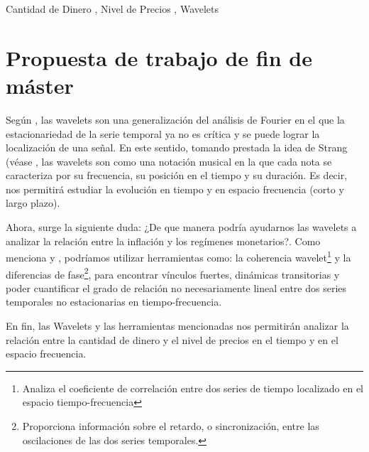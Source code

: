 \documentclass[a4paper,fleqn]{cas-sc}
\begin{document}
\begin{keywords}
    Cantidad de Dinero \sep
    Nivel de Precios \sep
    Wavelets
\end{keywords}

\maketitle


\section{Propuesta de trabajo de fin de máster}

Según \cite{Ramsey2016}, las wavelets son una generalización del análisis de Fourier en el que la estacionariedad de la serie temporal ya no es crítica y se puede lograr la localización de una señal. En este sentido, tomando prestada la idea de Strang (véase \cite{Strang1996}, las wavelets son como una notación musical en la que cada nota se caracteriza por su frecuencia, su posición en el tiempo y su duración. Es decir, nos permitirá estudiar la evolución en tiempo y en espacio frecuencia (corto y largo plazo). 

Ahora, surge la siguiente duda: ¿De que manera podría ayudarnos las wavelets a analizar la relación entre la inflación y los regímenes monetarios?. Como menciona \cite{AguiarConraria2008} y \cite{Jiang2015}, podríamos utilizar herramientas como: la coherencia wavelet\footnote[1]{Analiza el coeficiente de correlación entre dos series de tiempo localizado en el espacio tiempo-frecuencia} y la diferencias de fase\footnote[2]{Proporciona información sobre el retardo, o sincronización, entre las oscilaciones de las dos series temporales.}, para encontrar vínculos fuertes, dinámicas transitorias y poder cuantificar el grado de relación no necesariamente lineal entre dos series temporales no estacionarias en tiempo-frecuencia.

En fin, las Wavelets y las herramientas mencionadas nos permitirán analizar la relación entre la cantidad de dinero y el nivel de precios en el tiempo y en el espacio frecuencia.


\printcredits





\bio{}
\endbio
\end{document}
